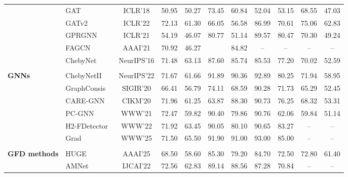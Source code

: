 \documentclass[10pt,journal]{IEEEtran}
\newcommand{\second}[1]{\cellcolor{tblsecond}{#1}}
\newcommand{\na}{--}
\begin{document}
\begin{table}[!t]
\begin{tabular}{
>{\centering\arraybackslash}m{1.78cm}
l
c
*{8}{c}
}
& GAT~\cite{velickovic2018gat} & ICLR'18 &
50.95 & 50.27 &
73.45 & 60.84 &
52.04 & 53.15 &
68.55 & 47.03 \\

& GATv2~\cite{brody2022gatv2} & ICLR'22 &
72.13 & 61.30 &
66.05 & 56.58 &
86.99 & 70.61 &
75.06 & 62.83 \\

& GPRGNN~\cite{chien2021gprgnn} & ICLR'21 &
54.19 & 46.07 &
80.77 & 51.14 &
89.57 & 80.47 &
70.30 & 49.24 \\

& FAGCN~\cite{bo2021fagcn} & AAAI'21 &
70.92 & 46.27 &
\second{92.07} & 84.82 &
\na & \na &
\na & \na \\

& ChebyNet~\cite{defferrard2016chebnet} & NeurIPS'16 &
71.48 & 63.13 &
87.60 & 85.74 &
85.53 & 77.20 &
70.02 & 52.59 \\
\multirow{-8}{=}{\makecell[c]{\textbf{General}\\\textbf{GNNs}}}
& ChebyNetII~\cite{he2022chebnetii} & NeurIPS'22 &
71.67 & 61.66 &
91.89 & 90.36 &
92.89 & 80.25 &
71.94 & 58.95 \\

\midrule

& GraphConsis~\cite{liu2020graphconsis} & SIGIR'20 &
66.41 & 56.79 &
74.11 & 68.59 &
90.28 & 71.73 &
65.29 & 52.45 \\

& CARE-GNN~\cite{dou2020caregnn} & CIKM'20 &
71.96 & 61.25 &
63.87 & 88.30 &
90.73 & 76.25 &
68.32 & 53.31 \\

& PC-GNN~\cite{liu2021pcgnn} & WWW'21 &
72.47 & 59.82 &
90.40 & 79.86 &
90.76 & 62.06 &
59.84 & 51.14 \\

& H2-FDetector~\cite{shi2022h2fdetector} & WWW'22 &
71.92 & 63.45 &
90.05 & 80.10 &
90.65 & 83.27 &
\na & \na \\

& Grad~\cite{yang2025grad} & WWW'25 &
71.50 & 65.50 &
91.90 & 91.00 &
93.00 & 85.00 &
\na & \na \\
\multirow{-6}{=}{\makecell[c]{\textbf{Structure-aware}\\
                             \textbf{GFD methods}}}
& HUGE~\cite{pan2025huge} & AAAI'25 &
68.50 & 58.60 &
85.30 & 79.20 &
84.70 & 72.50 &
72.80 & 61.40 \\

\midrule

& AMNet~\cite{chai2022amnet} & IJCAI'22 &
72.56 & 62.83 &
89.14 & 88.56 &
87.28 & 70.84 &
\na & \na \\


\end{tabular}
\end{table}
\end{document}
